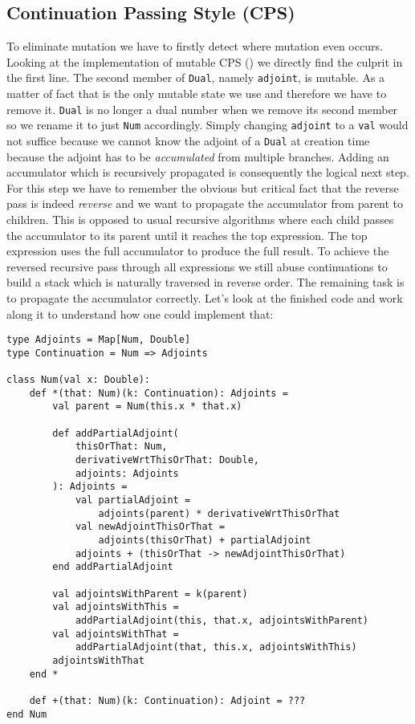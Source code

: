 \subsection{Continuation Passing Style (CPS)} \label{sec:functionalCps}

To eliminate mutation we have to firstly detect where mutation even occurs. Looking at the implementation of mutable CPS () we directly find the culprit in the first line. The second member of \lstinline{Dual}, namely \lstinline{adjoint}, is mutable. As a matter of fact that is the only mutable state we use and therefore we have to remove it. \lstinline{Dual} is no longer a dual number when we remove its second member so we rename it to just \lstinline{Num} accordingly. Simply changing \lstinline{adjoint} to a \lstinline{val} would not suffice because we cannot know the adjoint of a \lstinline{Dual} at creation time because the adjoint has to be \emph{accumulated} from multiple branches. Adding an accumulator which is recursively propagated is consequently the logical next step. For this step we have to remember the obvious but critical fact that the reverse pass is indeed \emph{reverse} and we want to propagate the accumulator from parent to children. This is opposed to usual recursive algorithms where each child passes the accumulator to its parent until it reaches the top expression. The top expression uses the full accumulator to produce the full result. To achieve the reversed recursive pass through all expressions we still abuse continuations to build a stack which is naturally traversed in reverse order. The remaining task is to propagate the accumulator correctly. Let's look at the finished code and work along it to understand how one could implement that:
\begin{lstlisting}
type Adjoints = Map[Num, Double]
type Continuation = Num => Adjoints

class Num(val x: Double):
    def *(that: Num)(k: Continuation): Adjoints =
        val parent = Num(this.x * that.x)

        def addPartialAdjoint(
            thisOrThat: Num, 
            derivativeWrtThisOrThat: Double, 
            adjoints: Adjoints
        ): Adjoints =
            val partialAdjoint = 
                adjoints(parent) * derivativeWrtThisOrThat
            val newAdjointThisOrThat = 
                adjoints(thisOrThat) + partialAdjoint
            adjoints + (thisOrThat -> newAdjointThisOrThat)
        end addPartialAdjoint

        val adjointsWithParent = k(parent)
        val adjointsWithThis = 
            addPartialAdjoint(this, that.x, adjointsWithParent)
        val adjointsWithThat = 
            addPartialAdjoint(that, this.x, adjointsWithThis)
        adjointsWithThat
    end *

    def +(that: Num)(k: Continuation): Adjoint = ???
end Num
\end{lstlisting}
